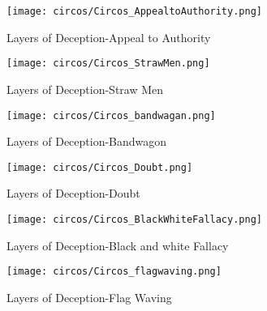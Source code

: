 \begin{figure*}[htbp]
    \begin{subfigure}[b]{0.50\textwidth}
    \centering
        \texttt{[image: circos/Circos\_AppealtoAuthority.png]}
        \caption{Layers of Deception-Appeal to Authority}
    \end{subfigure}
    \begin{subfigure}[b]{0.50\textwidth}
    \centering
        \texttt{[image: circos/Circos\_StrawMen.png]}
        \caption{Layers of Deception-Straw Men}
    \end{subfigure}    
    \begin{subfigure}[b]{0.50\textwidth}
    \centering
        \texttt{[image: circos/Circos\_bandwagan.png]}
        \caption{Layers of Deception-Bandwagon}
    \end{subfigure}
    \begin{subfigure}[b]{0.50\textwidth}
    \centering
        \texttt{[image: circos/Circos\_Doubt.png]}
        \caption{Layers of Deception-Doubt}
    \end{subfigure}
    \begin{subfigure}[b]{0.50\textwidth}
    \centering
        \texttt{[image: circos/Circos\_BlackWhiteFallacy.png]}
        \caption{Layers of Deception-Black and white Fallacy}
    \end{subfigure}
    \begin{subfigure}[b]{0.50\textwidth}
    \centering
        \texttt{[image: circos/Circos\_flagwaving.png]}
        \caption{Layers of Deception-Flag Waving}
    \end{subfigure}
\end{figure*}    

